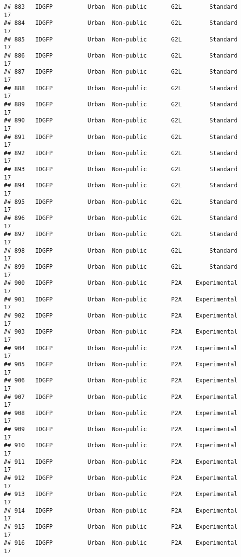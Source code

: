\documentclass[
]{article}
\begin{document}
\begin{verbatim}
## 883   IDGFP          Urban  Non-public       G2L        Standard        17
## 884   IDGFP          Urban  Non-public       G2L        Standard        17
## 885   IDGFP          Urban  Non-public       G2L        Standard        17
## 886   IDGFP          Urban  Non-public       G2L        Standard        17
## 887   IDGFP          Urban  Non-public       G2L        Standard        17
## 888   IDGFP          Urban  Non-public       G2L        Standard        17
## 889   IDGFP          Urban  Non-public       G2L        Standard        17
## 890   IDGFP          Urban  Non-public       G2L        Standard        17
## 891   IDGFP          Urban  Non-public       G2L        Standard        17
## 892   IDGFP          Urban  Non-public       G2L        Standard        17
## 893   IDGFP          Urban  Non-public       G2L        Standard        17
## 894   IDGFP          Urban  Non-public       G2L        Standard        17
## 895   IDGFP          Urban  Non-public       G2L        Standard        17
## 896   IDGFP          Urban  Non-public       G2L        Standard        17
## 897   IDGFP          Urban  Non-public       G2L        Standard        17
## 898   IDGFP          Urban  Non-public       G2L        Standard        17
## 899   IDGFP          Urban  Non-public       G2L        Standard        17
## 900   IDGFP          Urban  Non-public       P2A    Experimental        17
## 901   IDGFP          Urban  Non-public       P2A    Experimental        17
## 902   IDGFP          Urban  Non-public       P2A    Experimental        17
## 903   IDGFP          Urban  Non-public       P2A    Experimental        17
## 904   IDGFP          Urban  Non-public       P2A    Experimental        17
## 905   IDGFP          Urban  Non-public       P2A    Experimental        17
## 906   IDGFP          Urban  Non-public       P2A    Experimental        17
## 907   IDGFP          Urban  Non-public       P2A    Experimental        17
## 908   IDGFP          Urban  Non-public       P2A    Experimental        17
## 909   IDGFP          Urban  Non-public       P2A    Experimental        17
## 910   IDGFP          Urban  Non-public       P2A    Experimental        17
## 911   IDGFP          Urban  Non-public       P2A    Experimental        17
## 912   IDGFP          Urban  Non-public       P2A    Experimental        17
## 913   IDGFP          Urban  Non-public       P2A    Experimental        17
## 914   IDGFP          Urban  Non-public       P2A    Experimental        17
## 915   IDGFP          Urban  Non-public       P2A    Experimental        17
## 916   IDGFP          Urban  Non-public       P2A    Experimental        17

\end{verbatim}
\end{document}
